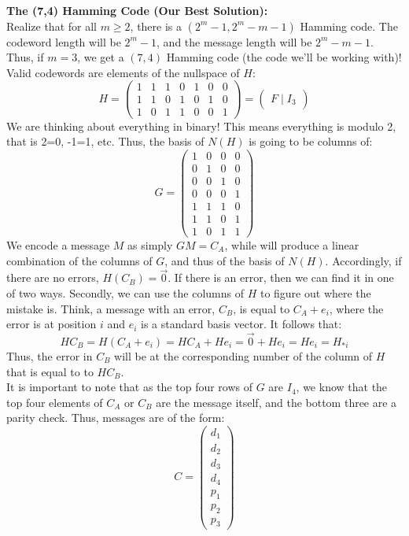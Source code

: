 \documentclass[12pt]{amsart}
\begin{document}
\textbf{The (7,4) Hamming Code (Our Best Solution):}\\
Realize that for all $m\geq2$, there is a $(2^m-1, 2^m-m-1)$ Hamming code. The codeword length will be $2^m-1$, and the message length will be $2^m-m-1$. Thus, if $m=3$, we get a $(7, 4)$ Hamming code (the code we'll be working with)!\\
Valid codewords are elements of the nullspace of $H$:
\[H = \begin{pmatrix}1&1&1&0&1&0&0\\1&1&0&1&0&1&0\\1&0&1&1&0&0&1\end{pmatrix} = \begin{pmatrix}F\mid I_3\end{pmatrix}\]
We are thinking about everything in binary! This means everything is modulo 2, that is 2=0, -1=1, etc. Thus, the basis of $N(H)$ is going to be columns of:
\[G=\begin{pmatrix}1&0&0&0\\0&1&0&0\\0&0&1&0\\0&0&0&1\\1&1&1&0\\1&1&0&1\\1&0&1&1\end{pmatrix}\]
We encode a message $M$ as simply $GM=C_A$, while will produce a linear combination of the columns of $G$, and thus of the basis of $N(H)$. Accordingly, if there are no errors, $H(C_B)=\vec{0}$. If there is an error, then we can find it in one of two ways. Secondly, we can use the columns of $H$ to figure out where the mistake is. Think, a message with an error, $C_B$, is equal to $C_A + e_i$, where the error is at position $i$ and $e_i$ is a standard basis vector. It follows that:
\[HC_B = H(C_A + e_i) = HC_A + He_i = \vec{0} + He_i = He_i = H_{*i}\]
Thus, the error in $C_B$ will be at the corresponding number of the column of $H$ that is equal to to $HC_B$.\\
It is important to note that as the top four rows of $G$ are $I_4$, we know that the top four elements of $C_A$ or $C_B$ are the message itself, and the bottom three are a parity check. Thus, messages are of the form:
\[C = \begin{pmatrix}d_1\\d_2\\d_3\\d_4\\p_1\\p_2\\p_3\end{pmatrix}\]
\end{document}
